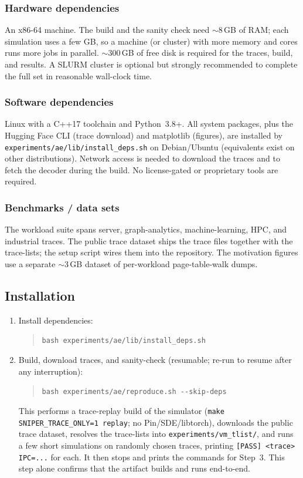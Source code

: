 \subsubsection{Hardware dependencies}
An x86-64 machine. The build and the sanity check need $\sim$8\,GB of RAM;
each simulation uses a few GB, so a machine (or cluster) with more memory and
cores runs more jobs in parallel. $\sim$300\,GB of free disk is required for
the traces, build, and results. A SLURM cluster is optional but strongly
recommended to complete the full set in reasonable wall-clock time.

\subsubsection{Software dependencies}
Linux with a C++17 toolchain and Python~3.8+. All system packages, plus the
Hugging Face CLI (trace download) and matplotlib (figures), are installed by
\texttt{experiments/ae/lib/install\_deps.sh} on Debian/Ubuntu (equivalents
exist on other distributions). Network access is needed to download the traces
and to fetch the decoder during the build. No license-gated or proprietary
tools are required.

\subsubsection{Benchmarks / data sets}
The workload suite spans server, graph-analytics, machine-learning, HPC, and
industrial traces. The public trace dataset ships the trace files together
with the trace-lists; the setup script wires them into the repository. The
motivation figures use a separate $\sim$3\,GB dataset of per-workload
page-table-walk dumps.

\subsection{Installation}

\begin{enumerate}
  \item Install dependencies:
\begin{quote}\small
\texttt{bash experiments/ae/lib/install\_deps.sh}
\end{quote}
  \item Build, download traces, and sanity-check (resumable; re-run to resume
        after any interruption):
\begin{quote}\small
\texttt{bash experiments/ae/reproduce.sh -{}-skip-deps}
\end{quote}
        This performs a trace-replay build of the simulator
        (\texttt{make SNIPER\_TRACE\_ONLY=1 replay}; no Pin/SDE/libtorch),
        downloads the public trace dataset, resolves the trace-lists into
        \texttt{experiments/vm\_tlist/}, and runs a few short simulations on
        randomly chosen traces, printing \texttt{[PASS] <trace> IPC=...} for
        each. It then stops and prints the commands for Step~3. This step alone
        confirms that the artifact builds and runs end-to-end.
\end{enumerate}

